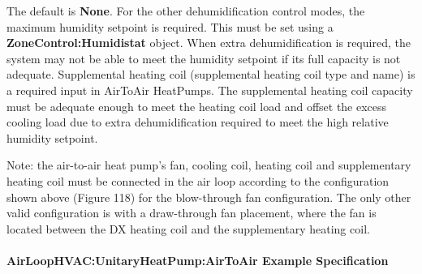 The default is \textbf{None}. For the other dehumidification control modes, the maximum humidity setpoint is required. This must be set using a \textbf{ZoneControl:Humidistat} object. When extra dehumidification is required, the system may not be able to meet the humidity setpoint if its full capacity is not adequate. Supplemental heating coil (supplemental heating coil type and name) is a required input in AirToAir HeatPumps. The supplemental heating coil capacity must be adequate enough to meet the heating coil load and offset the excess cooling load due to extra dehumidification required to meet the high relative humidity setpoint.

Note: the air-to-air heat pump's fan, cooling coil, heating coil and supplementary heating coil must be connected in the air loop according to the configuration shown above (Figure 118) for the blow-through fan configuration. The only other valid configuration is with a draw-through fan placement, where the fan is located between the DX heating coil and the supplementary heating coil.

\paragraph{AirLoopHVAC:UnitaryHeatPump:AirToAir Example Specification}\label{airloophvacunitaryheatpumpairtoair-example-specification}

